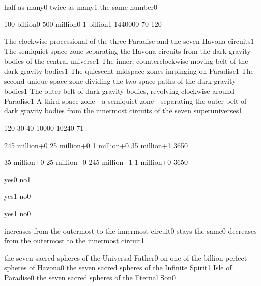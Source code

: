 {half as many}{0}
{twice as many}{1}
{the same number}{0}
\qstop

{100 billion}{0}
{500 million}{0}
{1 billion}{1}
{144000}{0}
{7}{0}
{12}{0}
\qstop

{The clockwise processional of the three Paradise and the seven Havona circuits}{1}
{The semiquiet space zone separating the Havona circuits from the dark gravity bodies of the central universe}{1}
{The inner, counterclockwise-moving belt of the dark gravity bodies}{1}
{The quiescent midspace zones impinging on Paradise}{1}
{The second unique space zone dividing the two space paths of the dark gravity bodies}{1}
{The outer belt of dark gravity bodies, revolving clockwise around Paradise}{1}
{A third space zone—a semiquiet zone—separating the outer belt of dark gravity bodies from the innermost circuits of the seven superuniverses}{1}
\qstop

{12}{0}
{3}{0}
{4}{0}
{1000}{0}
{1024}{0}
{7}{1}
\qstop

{245 million+}{0}
{25 million+}{0}
{1 million+}{0}
{35 million+}{1}
{365}{0}
\qstop

{35 million+}{0}
{25 million+}{0}
{245 million+}{1}
{1 million+}{0}
{365}{0}
\qstop

{yes}{0}
{no}{1}
\qstop

{yes}{1}
{no}{0}
\qstop

{yes}{1}
{no}{0}
\qstop

{increases from the outermost to the innermost circuit}{0}
{stays the same}{0}
{decreases from the outermost to the innermost circuit}{1}
\qstop

{the seven sacred spheres of the Universal Father}{0}
{on one of the billion perfect spheres of Havona}{0}
{the seven sacred spheres of the Infinite Spirit}{1}
{Isle of Paradise}{0}
{the seven sacred spheres of the Eternal Son}{0}
\qstop

